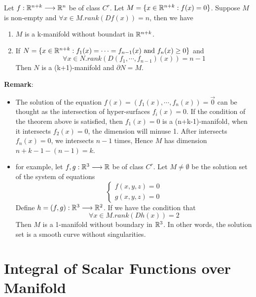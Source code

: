 \begin{theorem}
    Let $f:\mathbb{R}^{n+k}\longrightarrow\mathbb{R}^n$ be of class $C^r$. Let $M=\{x\in \mathbb{R}^{n+k}:f(x)=0\}$. Suppose $M$ is non-empty and $\forall x\in M.rank(Df(x))=n$, then we have
    \begin{enumerate}
        \item $M$ is a k-manifold without boundart in $\mathbb{R}^{n+k}$.
        \item If $N=\{x\in\mathbb{R}^{n+k}:f_1(x)=\cdots=f_{n-1}(x)\text{ and }f_n(x)\geq 0\}$ and $$\forall x \in N.rank(D(f_1,\cdots,f_{n-1})(x))=n-1$$
        Then $N$ is a (k+1)-manifold and $\partial N=M$.
    \end{enumerate}
\end{theorem}
\noindent\textbf{Remark}:
\begin{itemize}
    \item The solution of the equation $f(x)=(f_1(x),\cdots,f_n(x))=\vec{0}$ can be thought as the intersection of hyper-surfaces $f_i(x)=0$. If the condition of the theorem above is satisfied, then $f_1(x)=0$ is a (n+k-1)-manifold, when it intersects $f_2(x)=0$, the dimension will minuse 1. After intersects $f_n(x)=0$, we intersects $n-1$ times, Hence $M$ has dimension $n+k-1-(n-1)=k$.
    \item for example, let $f,g:\mathbb{R}^3\longrightarrow\mathbb{R}$ be of class $C^r$. Let $M\neq \emptyset$ be the solution set of the system of equations \begin{equation*}
        \begin{cases}
            f(x,y,z)=0\\
            g(x,y,z)=0
        \end{cases}
    \end{equation*}
    Define $h=(f,g):\mathbb{R}^3\longrightarrow\mathbb{R}^2$. If we have the condition that $$\forall x\in M.rank(Dh(x))=2$$
    Then $M$ is a 1-manifold without boundary in $\mathbb{R}^3$. In other words, the solution set is a smooth curve without singularities.
\end{itemize}

\section{Integral of Scalar Functions over Manifold}

